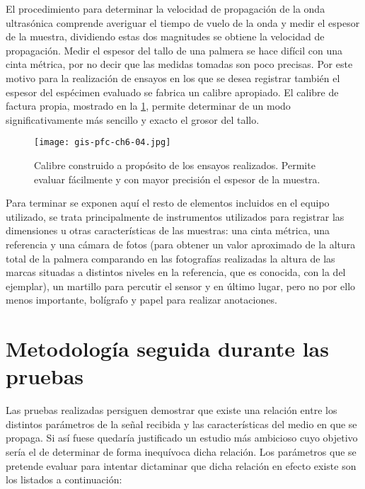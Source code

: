 El procedimiento para determinar la velocidad de propagación de la onda
ultrasónica comprende averiguar el tiempo de vuelo de la onda y medir el
espesor de la muestra, dividiendo estas dos magnitudes se obtiene la
velocidad de propagación. Medir el espesor del tallo de una palmera se hace
difícil con una cinta métrica, por no decir que las medidas tomadas son
poco precisas. Por este motivo para la realización de ensayos en los que se
desea registrar también el espesor del espécimen evaluado se fabrica un
calibre apropiado. El calibre de factura propia, mostrado en la
\cref{fig:calibre}, permite determinar de un modo significativamente más
sencillo y exacto el grosor del tallo.

\begin{figure}
    \begin{center}
	\texttt{[image: gis-pfc-ch6-04.jpg]}
    \end{center}
    \caption[Calibre en los ensayos]{Calibre construido a propósito de los
    ensayos realizados. Permite evaluar fácilmente y con mayor precisión el
    espesor de la muestra.}
    \label{fig:calibre}
\end{figure}

Para terminar se exponen aquí el resto de elementos incluidos en el equipo
utilizado, se trata principalmente de instrumentos utilizados para
registrar las dimensiones u otras características de las muestras: una
cinta métrica, una referencia y una cámara de fotos (para obtener un valor
aproximado de la altura total de la palmera comparando en las fotografías
realizadas la altura de las marcas situadas a distintos niveles en la
referencia, que es conocida, con la del ejemplar), un martillo para
percutir el sensor y en último lugar, pero no por ello menos importante,
bolígrafo y papel para realizar anotaciones.


\section{Metodología seguida durante las pruebas}\label{sec:methodology}

Las pruebas realizadas persiguen demostrar que existe una relación entre
los distintos parámetros de la señal recibida y las características del
medio en que se propaga. Si así fuese quedaría justificado un estudio más
ambicioso cuyo objetivo sería el de determinar de forma inequívoca dicha
relación. Los parámetros que se pretende evaluar para intentar dictaminar
que dicha relación en efecto existe son los listados a continuación:

